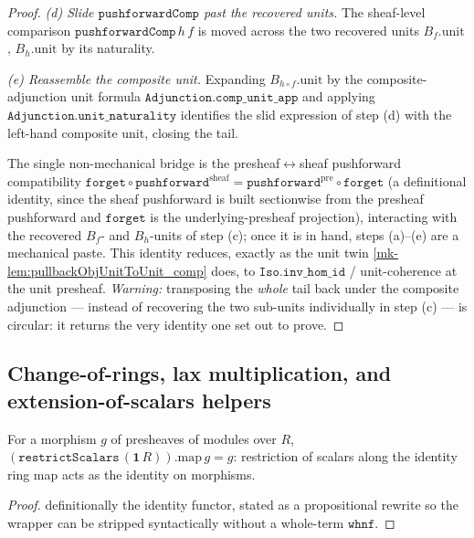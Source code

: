\begin{proof}
  \emph{(d) Slide \(\mathtt{pushforwardComp}\) past the recovered units.} The sheaf-level
  comparison \(\mathtt{pushforwardComp}\,h\,f\) is moved across the two recovered units
  \(B_f.\mathrm{unit}\), \(B_h.\mathrm{unit}\) by its naturality.

  \emph{(e) Reassemble the composite unit.} Expanding
  \(B_{h \circ f}.\mathrm{unit}\) by the composite-adjunction unit formula
  \(\mathtt{Adjunction.comp\_unit\_app}\) and applying \(\mathtt{Adjunction.unit\_naturality}\)
  identifies the slid expression of step (d) with the left-hand composite unit, closing the
  tail.

  The single non-mechanical bridge is the presheaf\(\leftrightarrow\)sheaf pushforward
  compatibility \(\mathtt{forget} \circ \mathtt{pushforward}^{\mathrm{sheaf}} =
  \mathtt{pushforward}^{\mathrm{pre}} \circ \mathtt{forget}\) (a definitional identity, since
  the sheaf pushforward is built sectionwise from the presheaf pushforward and
  \(\mathtt{forget}\) is the underlying-presheaf projection), interacting with the recovered
  \(B_f\)- and \(B_h\)-units of step (c); once it is in hand, steps (a)--(e) are a mechanical
  paste. This identity reduces, exactly as the unit twin
  \ref{mk-lem:pullbackObjUnitToUnit_comp} does, to \(\mathtt{Iso.inv\_hom\_id}\) /
  unit-coherence at the unit presheaf. \emph{Warning:} transposing the \emph{whole} tail back
  under the composite adjunction --- instead of recovering the two sub-units individually in
  step (c) --- is circular: it returns the very identity one set out to prove.
\end{proof}

\subsection{Change-of-rings, lax multiplication, and extension-of-scalars helpers}
\label{mk-subsec:tensorobj_changeofrings_helpers}


\begin{lemma}\label{mk-lem:restrictscalarsid_map}
  \leanok

  For a morphism \(g\) of presheaves of modules over \(R\),
  \((\mathtt{restrictScalars}\,(\mathbf{1}\,R)).\mathrm{map}\,g = g\): restriction of scalars
  along the identity ring map acts as the identity on morphisms.
\end{lemma}
\begin{proof}
  \leanok
  definitionally the identity functor, stated as a propositional rewrite so the wrapper can
  be stripped syntactically without a whole-term \(\mathtt{whnf}\).
\end{proof}

